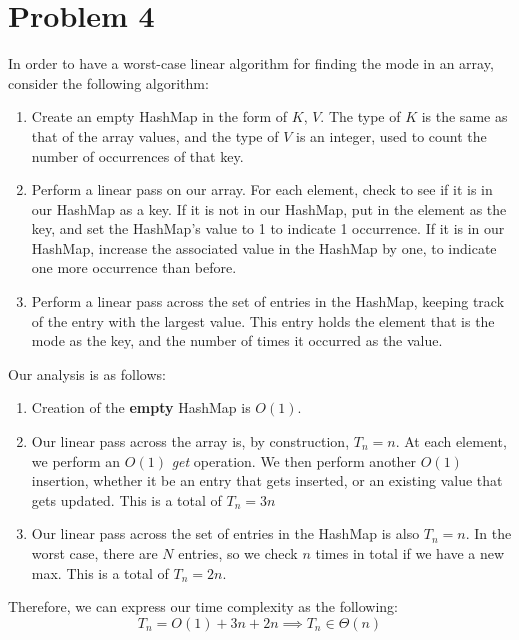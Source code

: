 \section*{Problem 4}
In order to have a worst-case linear algorithm for finding the mode in an array, consider the following algorithm:
\begin{enumerate}
    \item Create an empty HashMap in the form of $K$, $V$. The type of $K$ is the same as that of the array values, and the type of $V$ is an integer, used to count the number of occurrences of that key.
    \item Perform a linear pass on our array. For each element, check to see if it is in our HashMap as a key.
        \subitem If it is not in our HashMap, put in the element as the key, and set the HashMap's value to 1 to indicate 1 occurrence.
        \subitem If it is in our HashMap, increase the associated value in the HashMap by one, to indicate one more occurrence than before.
    \item Perform a linear pass across the set of entries in the HashMap, keeping track of the entry with the largest value. This entry holds the element that is the mode as the key, and the number of times it occurred as the value.
\end{enumerate}

Our analysis is as follows:\\
\begin{enumerate}
    \item Creation of the \textbf{empty} HashMap is $O(1)$.
    \item Our linear pass across the array is, by construction, $T_n = n$. At each element, we perform an $O(1)$ \textit{get} operation. We then perform another $O(1)$ insertion, whether it be an entry that gets inserted, or an existing value that gets updated. This is a total of $T_n = 3n$
    \item Our linear pass across the set of entries in the HashMap is also  $T_n = n$. In the worst case, there are $N$ entries, so we check $n$ times in total if we have a new max. This is a total of $T_n = 2n$.
\end{enumerate}
Therefore, we can express our time complexity as the following:
\\
$$
    T_n = O(1) + 3n + 2n \implies T_n \in \Theta(n)
$$
